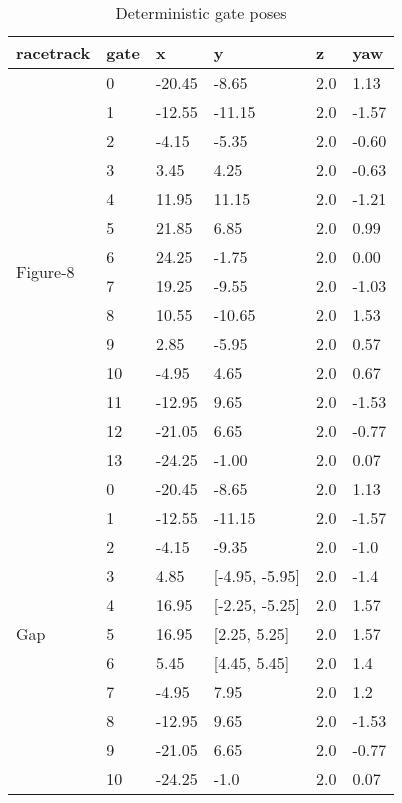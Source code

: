\begin{table}[h]
    \footnotesize
    \caption{Deterministic gate poses\label{tab:gate_pos}}
    \centering
    \begin{tabular}{|l|l|l|l|l|l|}
    \hline
    racetrack & gate & x & y & z & yaw\\ 
    \hline
    \hline
    \multirow{14}{*}{Figure-8}   
    &0 &-20.45& -8.65&2.0& 1.13\\ \cline{2-6}
    &1 &-12.55&-11.15&2.0&-1.57\\ \cline{2-6}
    &2 &-4.15 & -5.35&2.0&-0.60\\ \cline{2-6}
    &3 &3.45  &  4.25&2.0&-0.63\\ \cline{2-6}
    &4 &11.95 & 11.15&2.0&-1.21\\ \cline{2-6}
    &5 &21.85 &  6.85&2.0& 0.99\\ \cline{2-6}
    &6 &24.25 & -1.75&2.0& 0.00\\ \cline{2-6}
    &7 &19.25 & -9.55&2.0&-1.03\\ \cline{2-6}
    &8 &10.55 &-10.65&2.0& 1.53\\ \cline{2-6}
    &9 &2.85  & -5.95&2.0& 0.57\\ \cline{2-6}
    &10&-4.95 &  4.65&2.0& 0.67\\ \cline{2-6}
    &11&-12.95&  9.65&2.0&-1.53\\ \cline{2-6}
    &12&-21.05&  6.65&2.0&-0.77\\ \cline{2-6}
    &13&-24.25& -1.00&2.0& 0.07\\
    \hline
    \hline
    \multirow{14}{*}{Gap}   
    &0 &-20.45&-8.65         &2.0& 1.13\\ \cline{2-6}
    &1 &-12.55&-11.15        &2.0&-1.57\\ \cline{2-6}
    &2 &-4.15 &-9.35         &2.0& -1.0\\ \cline{2-6}
    &3 &4.85  &[-4.95, -5.95]&2.0& -1.4\\ \cline{2-6}
    &4 &16.95 &[-2.25, -5.25]&2.0& 1.57\\ \cline{2-6}
    &5 &16.95 &[2.25,   5.25]&2.0& 1.57\\ \cline{2-6}
    &6 &5.45  &[4.45,   5.45]&2.0&  1.4\\ \cline{2-6}
    &7 &-4.95 &7.95          &2.0&  1.2\\ \cline{2-6}
    &8 &-12.95&9.65          &2.0&-1.53\\ \cline{2-6}
    &9 &-21.05&6.65          &2.0&-0.77\\ \cline{2-6}
    &10&-24.25&-1.0          &2.0& 0.07\\
    \hline
    \end{tabular}
\end{table}






